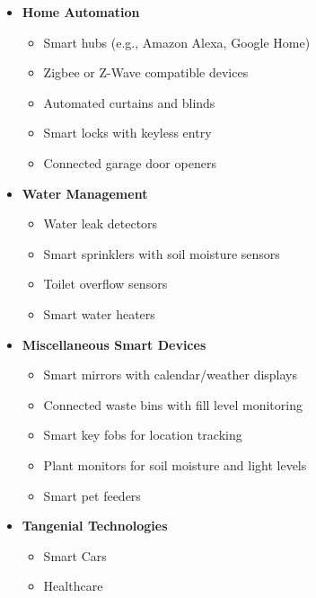 \documentclass[journal]{IEEEtran} %
\begin{document}
\begin{itemize}[]
    \item{\textbf{Home Automation}}
        \begin{itemize}
            \item Smart hubs (e.g., Amazon Alexa, Google Home)
            \item Zigbee or Z-Wave compatible devices
            \item Automated curtains and blinds
            \item Smart locks with keyless entry
            \item Connected garage door openers
        \end{itemize}

    \item{\textbf{Water Management}}
        \begin{itemize}
            \item Water leak detectors
            \item Smart sprinklers with soil moisture sensors
            \item Toilet overflow sensors
            \item Smart water heaters
        \end{itemize}

    \item{\textbf{Miscellaneous Smart Devices}}
        \begin{itemize}
            \item Smart mirrors with calendar/weather displays
            \item Connected waste bins with fill level monitoring
            \item Smart key fobs for location tracking
            \item Plant monitors for soil moisture and light levels
            \item Smart pet feeders
        \end{itemize}

    \item{\textbf{Tangenial Technologies}}
        \begin{itemize}
            \item Smart Cars
            \item Healthcare
        \end{itemize}

\end{itemize}


\pagebreak
\end{document}

